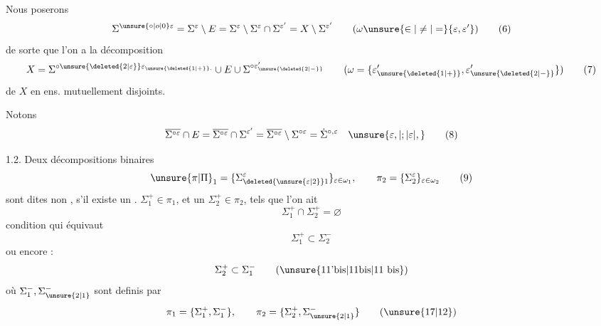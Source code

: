 Nous poserons
\[
\Sigma^{\unsure{\circ|o|0}\varepsilon}=\Sigma^\varepsilon\setminus E=\Sigma^\varepsilon\setminus\Sigma^\varepsilon\cap\Sigma^{\varepsilon'}=X\setminus\Sigma^{\varepsilon'}\qquad(\omega\unsure{\in|\ne|=}\{\varepsilon,\varepsilon'\})\tag*{(6)}
\]
de sorte que l'on a la décomposition
\[
X=\Sigma^{\circ\unsure{\deleted{2|\varepsilon}}\varepsilon_{\unsure{\deleted{1|+}}.}}\cup E\cup\Sigma^{\circ\varepsilon'_{\unsure{\deleted{2|-}}}}\qquad(\omega=\{\varepsilon'_{\unsure{\deleted{1|+}}},\varepsilon'_{\unsure{\deleted{2|-}}}\})\tag*{(7)}
\]
de $X$ en  ens. mutuellement disjoints.

Notons
\[
\overline{\Sigma^{\circ\varepsilon}}\cap E=\overline{\Sigma^{\circ\varepsilon}}\cap\Sigma^{\varepsilon'}=\overline{\Sigma^{\circ\varepsilon}}\setminus\Sigma^{\circ\varepsilon}=\dot{\Sigma}^{\circ,\varepsilon}\quad\unsure{\varepsilon,|;|\varepsilon|,}\tag*{(8)}
\]

\par
{}

1.2. Deux décompositions binaires
\[
\unsure{\pi|\Pi}_1=\{\Sigma_{\deleted{\unsure{\varepsilon|2}}1}^\varepsilon\}_{\varepsilon\in\omega_1},\qquad\pi_2=\{\Sigma_2^\varepsilon\}_{\varepsilon\in\omega_2}\tag*{(9)}
\]
sont dites non \uline{},  s'il existe un . $\Sigma_1^+\in\pi_1$, et un $\Sigma_2^+\in\pi_2$, tels que l'on ait
\[
\Sigma_1^+\cap\Sigma_2^+=\varnothing\tag*{(10)}
\]
condition qui équivaut 
\[
\Sigma_1^+\subset\Sigma_2^-\tag*{(11)}
\]
ou encore :
\[
\Sigma_2^+\subset\Sigma_1^-\tag*{(\unsure{11'bis|11bis|11 bis})}
\]
où $\Sigma_1^-,\Sigma_{\unsure{2|1}}^-$ sont definis par
\[
\pi_1=\{\Sigma_1^+,\Sigma_1^-\},\qquad\pi_2=\{\Sigma_2^+,\Sigma_{\unsure{2|1}}^-\}\tag*{(\unsure{17|12})}
\]
\endgroup

